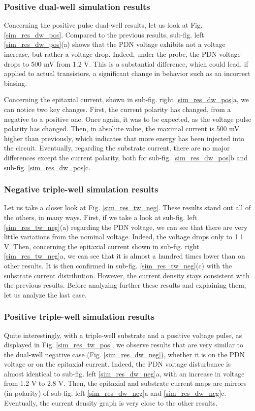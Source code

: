	\subsubsection{Positive dual-well simulation results}
		Concerning the positive pulse dual-well results, let us look at Fig. \ref{sim_res_dw_pos}.
		Compared to the previous results, sub-fig. left \ref{sim_res_dw_pos}(a) shows that the PDN voltage exhibits not a voltage increase, but rather a voltage drop.
		Indeed, under the probe, the PDN voltage drops to 500 mV from 1.2 V.
		This is a substantial difference, which could lead, if applied to actual transistors, a significant change in behavior such as an incorrect biasing.

		Concerning the epitaxial current, shown in sub-fig. right \ref{sim_res_dw_pos}a, we can notice two key changes.
		First, the current polarity has changed, from a negative to a positive one.
		Once again, it was to be expected, as the voltage pulse polarity has changed.
		Then, in absolute value, the maximal current is 500 mV higher than previously, which indicates that more energy has been injected into the circuit.
		Eventually, regarding the substrate current, there are no major differences except the current polarity, both for sub-fig. \ref{sim_res_dw_pos}b and sub-fig. \ref{sim_res_dw_pos}c.

	\subsubsection{Negative triple-well simulation results}
		Let us take a closer look at Fig. \ref{sim_res_tw_neg}.
		These results stand out all of the others, in many ways.
		First, if we take a look at sub-fig. left \ref{sim_res_tw_neg}(a) regarding the PDN voltage, we can see that there are very little variations from the nominal voltage.
		Indeed, the voltage drops only to 1.1 V.
		Then, concerning the epitaxial current shown in sub-fig. right \ref{sim_res_tw_neg}a, we can see that it is almost a hundred times lower than on other results.
		It is then confirmed in sub-fig. \ref{sim_res_tw_neg}(c) with the substrate current distribution.
		However, the current density stays consistent with the previous results.
		Before analyzing further these results and explaining them, let us analyze the last case.

	\subsubsection{Positive triple-well simulation results}
		Quite interestingly, with a triple-well substrate and a positive voltage pulse, as displayed in Fig. \ref{sim_res_tw_pos}, we observe results that are very similar to the dual-well negative case (Fig. \ref{sim_res_dw_neg}), whether it is on the PDN voltage or on the epitaxial current.
		Indeed, the PDN voltage disturbance is almost identical to sub-fig. left \ref{sim_res_dw_neg}a, with an increase in voltage from 1.2 V to 2.8 V.
		Then, the epitaxial and substrate current maps are mirrors (in polarity) of sub-fig. left \ref{sim_res_dw_neg}a and \ref{sim_res_dw_neg}c.
		Eventually, the current density graph is very close to the other results.

